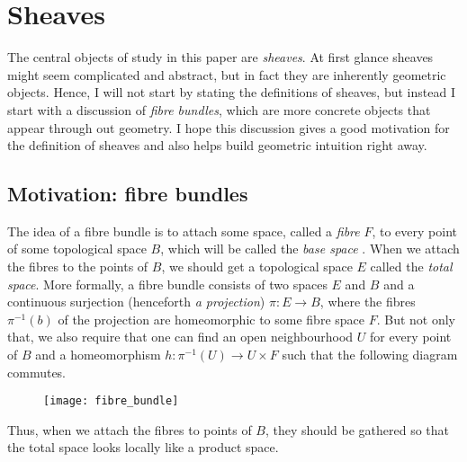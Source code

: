\section{Sheaves}
The central objects of study in this paper are \emph{sheaves}. At first
glance sheaves might seem complicated and abstract, but in fact they are
inherently geometric objects. Hence, I will not start by stating the
definitions of sheaves, but instead I start with a discussion of
\emph{fibre bundles}, which are more concrete objects that appear through
out geometry. I hope this discussion gives a good motivation for
the definition of sheaves and also helps build geometric intuition right
away.

\subsection{Motivation: fibre bundles}
The idea of a fibre bundle is to attach some space, called a \emph{fibre}
$F$, to every point of some topological space $B$, which will be called
the \emph{base space} \cite{hatcher}. When we attach the fibres to the
points of $B$, we should get a topological space $E$ called the
\emph{total space}. More formally, a fibre bundle consists of two spaces $E$
and $B$ and a continuous surjection (henceforth \emph{a projection})
$\pi:E\to B$, where the fibres $\pi^{-1}(b)$ of the projection are
homeomorphic to some fibre space $F$. But not only that, we also require
that one can find an open neighbourhood $U$ for every point of $B$ and a
homeomorphism $h:\pi^{-1}(U)\to U\times F$ such that the following diagram
commutes.
\begin{figure}[H]
  \centering
  \begin{minipage}{.45\textwidth}
    \centering
  \end{minipage}%
  \begin{minipage}{.45\textwidth}
    \centering
    \texttt{[image: fibre\_bundle]}
  \end{minipage}
\end{figure}
Thus, when we attach the fibres to points of $B$, they should be gathered
so that the total space looks locally like a product space.

